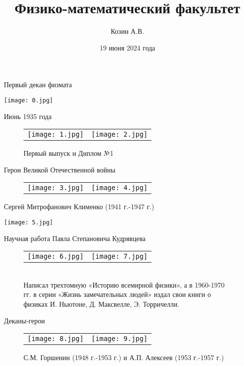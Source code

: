 \documentclass[pdf,hyperref={unicode}, aspectratio=43, serif,11pt]{beamer}
\title[физмат]{Физико-математический факультет}
\author{Козин А.В.}
\date{19 июня 2024 года}
\institute[]{Орловский государственный
университет имени И.\,С.~Тургенева}
\begin{document}
\begin{frame}
\titlepage{}
\end{frame}
\begin{frame}{Первый декан физмата}
    \begin{center}
        \texttt{[image: 0.jpg]}
    \end{center}
\end{frame}
\begin{frame}{Июнь 1935 года}
    \begin{figure}[h]
        \begin{tabular}{ll}
            \texttt{[image: 1.jpg]}
            &
            \texttt{[image: 2.jpg]}
        \end{tabular}
        \caption{Первый выпуск и Диплом №1}
        \label{Fig:Race}
    \end{figure}
\end{frame}
\begin{frame}{Герои Великой Отечественной войны}
    \begin{figure}[h]
        \begin{tabular}{ll}
            \texttt{[image: 3.jpg]}
            &
            \texttt{[image: 4.jpg]}
        \end{tabular}
        \label{Fig:Race}
    \end{figure}
\end{frame}
\begin{frame}{Сергей Митрофанович Клименко (1941 г.-1947 г.)}
    \begin{center}
        \texttt{[image: 5.jpg]}
    \end{center}
\end{frame}
\begin{frame}{Научная работа Павла Степановича Кудрявцева}
    \begin{figure}[h]
        \begin{tabular}{ll}
            \texttt{[image: 6.jpg]}
            &
            \texttt{[image: 7.jpg]}
        \end{tabular} \\
        Написал трехтомную «Историю всемирной физики», а в 1960-1970 гг. в серии «Жизнь замечательных людей» издал свои книги о физиках И. Ньютоне, Д. Максвелле, Э. Торричелли.
        \label{Fig:Race}
    \end{figure}
\end{frame}
\begin{frame}{Деканы-герои}
    \begin{figure}[h]
        \begin{tabular}{ll}
            \texttt{[image: 8.jpg]}
            &
            \texttt{[image: 9.jpg]}
        \end{tabular}
        \label{Fig:Race}
        \caption{С.М. Горшенин (1948 г.-1953 г.) и А.П. Алексеев (1953 г.-1957 г.)}
    \end{figure}
\end{frame}
\end{document}
